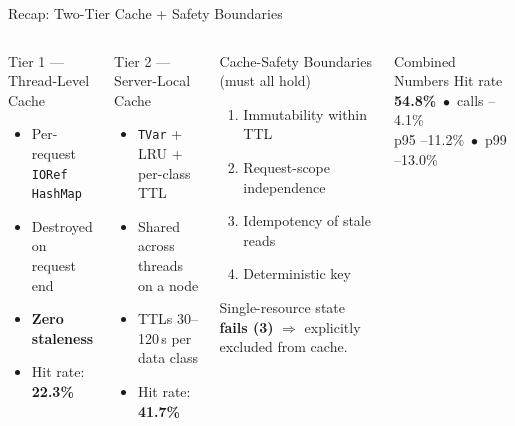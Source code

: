 \documentclass[aspectratio=169,xcolor=dvipsnames,9pt]{beamer}
\begin{document}
\begin{frame}{Recap: Two-Tier Cache + Safety Boundaries}
\begin{columns}[T]
  \begin{block}{Tier 1 --- Thread-Level Cache}
    \footnotesize
    \begin{itemize}
      \item Per-request \texttt{IORef HashMap}
      \item Destroyed on request end
      \item \textbf{Zero staleness}
      \item Hit rate: \textbf{22.3\%}
    \end{itemize}
  \end{block}
  \begin{block}{Tier 2 --- Server-Local Cache}
    \footnotesize
    \begin{itemize}
      \item \texttt{TVar} + LRU + per-class TTL
      \item Shared across threads on a node
      \item TTLs 30--120\,s per data class
      \item Hit rate: \textbf{41.7\%}
    \end{itemize}
  \end{block}

  \begin{alertblock}{Cache-Safety Boundaries (must all hold)}
    \footnotesize
    \begin{enumerate}
      \item Immutability within TTL
      \item Request-scope independence
      \item Idempotency of stale reads
      \item Deterministic key
    \end{enumerate}
    Single-resource state \textbf{fails (3)} $\Rightarrow$ explicitly excluded from cache.
  \end{alertblock}
  \begin{exampleblock}{Combined Numbers}
    \footnotesize\centering
    Hit rate \textbf{54.8\%} \,$\bullet$\, calls --4.1\%\\
    p95 --11.2\% \,$\bullet$\, p99 --13.0\%
  \end{exampleblock}
\end{columns}
\end{frame}
\end{document}
